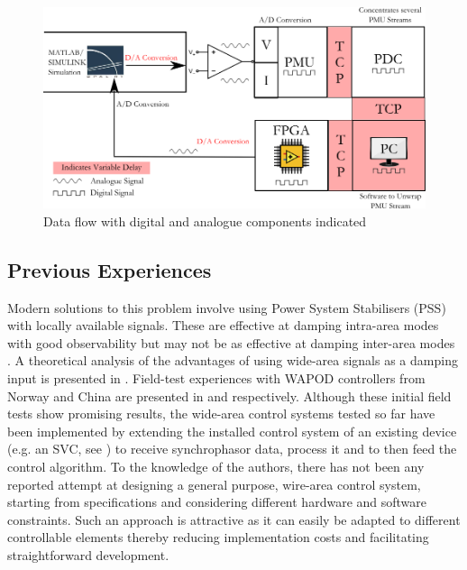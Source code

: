 \documentclass[conference]{IEEEtran}
\begin{document}
\begin{figure}[!t]
\centering
\includegraphics[width=5in]{DataFlow.png}
\caption{Data flow with digital and analogue components indicated}
\label{Data_path}
\end{figure}

\subsection{Previous Experiences}
Modern solutions to this problem involve using Power System Stabilisers (PSS) with locally available signals. These are effective at damping intra-area modes with good observability but may not be as effective at damping inter-area modes \cite{Dmello} \cite{localREMcomparison}. A theoretical analysis of the advantages of using wide-area signals as a damping input is presented in \cite{Yuwa}. Field-test experiences with WAPOD controllers from Norway and China are presented in \cite{WAPODNorway} and \cite{WAPODChina} respectively. Although these initial field tests show promising results, the wide-area control systems tested so far have been implemented by extending the installed control system of an existing device (e.g. an SVC, see \cite{WAPODNorway}) to receive synchrophasor data, process it and to then feed the control algorithm. To the knowledge of the authors, there has not been any reported attempt at designing a general purpose, wire-area control system, starting from specifications and considering different hardware and software constraints. Such an approach is attractive as it can easily be adapted to different controllable elements thereby reducing implementation costs and facilitating straightforward development.
\end{document}
